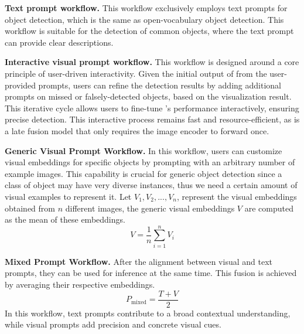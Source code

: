 \noindent\textbf{Text prompt workflow.} This workflow exclusively employs text prompts for object detection, which is the same as open-vocabulary object detection. This workflow is suitable for the detection of common objects, where the text prompt can provide clear descriptions.

\noindent\textbf{Interactive visual prompt workflow.} This workflow is designed around a core principle of user-driven interactivity. Given the initial output of \ourmodel{} from the user-provided prompts, users can refine the detection results by adding additional prompts on missed or falsely-detected objects, based on the visualization result. This iterative cycle allows users to fine-tune \ourmodel{}'s performance interactively, ensuring precise detection. This interactive process remains fast and resource-efficient, as \ourmodel{} is a late fusion model that only requires the image encoder to forward once.


\noindent\textbf{Generic Visual Prompt Workflow.} In this workflow, users can customize visual embeddings for specific objects by prompting \ourmodel{} with an arbitrary number of example images. This capability is crucial for generic object detection since a class of object may have very diverse instances, thus we need a certain amount of visual examples to represent it. Let ${V_1}, {V_2},...,{V_n}$, represent the visual embeddings obtained from $n$ different images, the generic visual embeddings $V$ are computed as the mean of these embeddings.
\begin{equation}
    V = \frac{1}{n} \sum_{i=1}^{n} V_i
\end{equation}

\noindent\textbf{Mixed Prompt Workflow.} After the alignment between visual and text prompts, they can be used for inference at the same time. This fusion is achieved by averaging their respective embeddings.
\begin{equation}
    P_{\text{mixed}} = \frac{T + V}{2}
\end{equation}
In this workflow, text prompts contribute to a broad contextual understanding, while visual prompts add precision and concrete visual cues.
